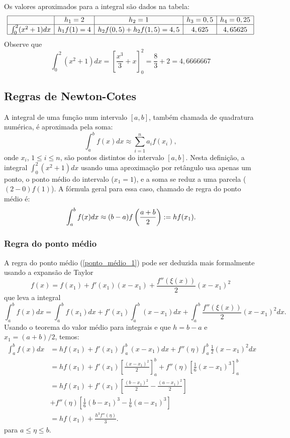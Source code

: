 Os valores aproximados para a integral são dados na tabela:
$$
\begin{array}{|c|c|c|c|c|}
\hline
&h_1=2&h_2=1&h_3=0,5&h_4=0,25\\
\hline
\int_0^2(x^2+1)dx&h_1f(1)=4&h_2f(0,5)+h_2f(1,5)=4,5&4,625&4,65625\\
\hline
\end{array}
$$
Observe que
$$
\int_0^2(x^2+1)dx=\left[\frac{x^3}{3}+x\right]_0^2=\frac{8}{3}+2=4,6666667
$$

\subsection{Regras de Newton-Cotes}

A integral de uma função num intervalo $[a,b]$, também chamada de quadratura numérica, é aproximada pela soma:
\begin{equation*}
\int_a^bf(x)dx\approx\sum_{i=1}^na_if(x_i),  
\end{equation*}
onde $x_i$, $1\leq i\leq n$, são pontos distintos do intervalo $[a,b]$. Nesta definição, a integral $\int_0^2(x^2+1)dx$ usando uma aproximação por retângulo usa apenas um ponto, o ponto médio do intervalo ($x_1=1$), e a soma se reduz a uma parcela ($(2-0)f(1)$). A fórmula geral para essa caso, chamado de regra do ponto médio é:
\begin{equation}{\label{ponto_médio_1}}
\int_a^bf(x)dx\approx (b-a)f\left(\frac{a+b}{2}\right):=hf(x_1).
\end{equation}

\subsubsection{Regra do ponto médio}
A regra do ponto médio (\ref{ponto_médio_1}) pode ser deduzida mais formalmente usando a expansão de Taylor
$$
f(x)=f(x_1)+f'(x_1)(x-x_1)+\frac{f''(\xi(x))}{2}(x-x_1)^2
$$
que leva a integral
$$
\int_a^b f(x)dx=\int_a^b f(x_1) dx+f'(x_1)\int_a^b(x-x_1)dx +\int_a^b\frac{f''(\xi(x))}{2}(x-x_1)^2dx.
$$
Usando o teorema do valor médio para integrais e que $h=b-a$ e $x_1=(a+b)/2$, temos:
\begin{align*}
\int_a^b f(x)dx &= h f(x_1) + f'(x_1)\int_a^b(x-x_1)dx+f''(\eta)\int_a^b\frac{1}{2}(x-x_1)^2dx\\
&= h f(x_1) +f'(x_1)\left[\frac{(x-x_1)^2}{2}\right]_a^b+f''(\eta)\left[\frac{1}{6}(x-x_1)^3\right]_a^b\\
&= h f(x_1) +f'(x_1)\left[\frac{(b-x_1)^2}{2}-\frac{(a-x_1)^2}{2}\right]\\
&+f''(\eta)\left[\frac{1}{6}(b-x_1)^3-\frac{1}{6}(a-x_1)^3\right]\\
&= h f(x_1) +\frac{h^3f''(\eta)}{3}.
\end{align*}
para $a\leq \eta\leq b$.

